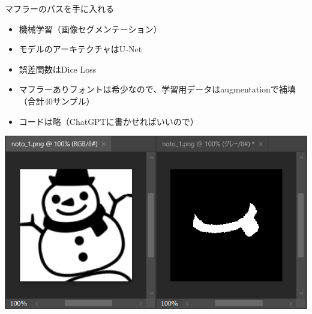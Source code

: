 \documentclass[unicode,14pt]{beamer}
\begin{document}
\begin{frame}[t]{マフラーのパスを手に入れる}
  \sffamily
  \begin{itemize}
\item 機械学習（画像セグメンテーション）
\item モデルのアーキテクチャはU-Net
\item 誤差関数はDice Loss
\item マフラーありフォントは希少なので、学習用データはaugmentationで補填（合計40サンプル）
\item コードは略（ChatGPTに書かせればいいので）
  \end{itemize}
  \begin{center}
    \includegraphics[width=.3\textwidth]{figures/traindata.png}
  \end{center}
\end{frame}
\end{document}

